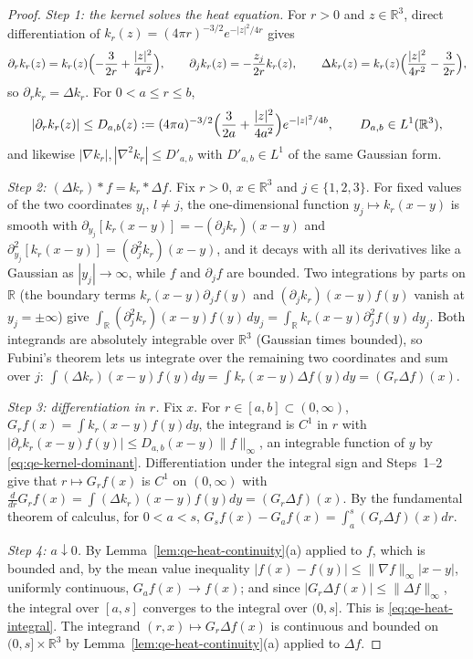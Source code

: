 \documentclass[11pt]{article}
\theoremstyle{definition}
\theoremstyle{plain}
\newcommand{\R}{\mathbb R}
\newcommand{\norm}[1]{\lVert #1\rVert}
\begin{document}
\begin{proof}
\emph{Step 1: the kernel solves the heat equation.}  For $r>0$ and
$z\in\R^3$, direct differentiation of $k_r(z)=(4\pi r)^{-3/2}e^{-|z|^2/4r}$
gives
\[
 \partial_rk_r(z)=k_r(z)\Bigl(-\frac3{2r}+\frac{|z|^2}{4r^2}\Bigr),
 \qquad
 \partial_j k_r(z)=-\frac{z_j}{2r}k_r(z),
 \qquad
 \Delta k_r(z)=k_r(z)\Bigl(\frac{|z|^2}{4r^2}-\frac3{2r}\Bigr),
\]
so $\partial_rk_r=\Delta k_r$.  For $0<a\le r\le b$,
\begin{equation}\label{eq:qe-kernel-dominant}
 |\partial_rk_r(z)|\le D_{a,b}(z):=(4\pi a)^{-3/2}
 \Bigl(\frac3{2a}+\frac{|z|^2}{4a^2}\Bigr)e^{-|z|^2/4b},
 \qquad D_{a,b}\in L^1(\R^3),
\end{equation}
and likewise $|\nabla k_r|,|\nabla^2k_r|\le D'_{a,b}$ with
$D'_{a,b}\in L^1$ of the same Gaussian form.

\emph{Step 2: $(\Delta k_r)*f=k_r*\Delta f$.}  Fix $r>0$, $x\in\R^3$ and
$j\in\{1,2,3\}$.  For fixed values of the two coordinates $y_l$, $l\ne j$,
the one-dimensional function $y_j\mapsto k_r(x-y)$ is smooth with
$\partial_{y_j}[k_r(x-y)]=-(\partial_jk_r)(x-y)$ and
$\partial_{y_j}^2[k_r(x-y)]=(\partial_j^2k_r)(x-y)$, and it decays with all
its derivatives like a Gaussian as $|y_j|\to\infty$, while $f$ and
$\partial_jf$ are bounded.  Two integrations by parts on $\R$ (the boundary
terms $k_r(x-y)\partial_jf(y)$ and $(\partial_jk_r)(x-y)f(y)$ vanish at
$y_j=\pm\infty$) give
$\int_\R(\partial_j^2k_r)(x-y)f(y)\,dy_j=\int_\R k_r(x-y)\partial_j^2f(y)\,dy_j$.
Both integrands are absolutely integrable over $\R^3$ (Gaussian times
bounded), so Fubini's theorem lets us integrate over the remaining two
coordinates and sum over $j$:
$\int(\Delta k_r)(x-y)f(y)dy=\int k_r(x-y)\Delta f(y)dy=(G_r\Delta f)(x)$.

\emph{Step 3: differentiation in $r$.}  Fix $x$.  For $r\in[a,b]\subset(0,\infty)$,
$G_rf(x)=\int k_r(x-y)f(y)dy$, the integrand is $C^1$ in $r$ with
$|\partial_rk_r(x-y)f(y)|\le D_{a,b}(x-y)\norm f_\infty$, an integrable
function of $y$ by \eqref{eq:qe-kernel-dominant}.  Differentiation under
the integral sign and Steps~1--2 give that $r\mapsto G_rf(x)$ is $C^1$ on
$(0,\infty)$ with
$\frac d{dr}G_rf(x)=\int(\Delta k_r)(x-y)f(y)dy=(G_r\Delta f)(x)$.
By the fundamental theorem of calculus, for $0<a<s$,
$G_sf(x)-G_af(x)=\int_a^s(G_r\Delta f)(x)dr$.

\emph{Step 4: $a\downarrow0$.}  By Lemma~\ref{lem:qe-heat-continuity}(a)
applied to $f$, which is bounded and, by the mean value inequality
$|f(x)-f(y)|\le\norm{\nabla f}_\infty|x-y|$, uniformly continuous,
$G_af(x)\to f(x)$; and
since $|G_r\Delta f(x)|\le\norm{\Delta f}_\infty$, the integral over $[a,s]$
converges to the integral over $(0,s]$.  This is
\eqref{eq:qe-heat-integral}.  The integrand $(r,x)\mapsto G_r\Delta f(x)$
is continuous and bounded on $(0,s]\times\R^3$ by
Lemma~\ref{lem:qe-heat-continuity}(a) applied to $\Delta f$.


\end{proof}
\end{document}
